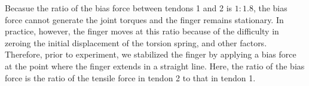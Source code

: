 \documentclass{llncs}
\begin{document}
Becasue the ratio of the bias force between tendons 1 and 2 is $1:1.8$, 
the bias force cannot generate the joint torques and 
the finger remains stationary.
In practice, however, the finger moves at this ratio
because of the difficulty in zeroing the initial displacement of the torsion spring, and other factors.
Therefore, prior to experiment,
we stabilized the finger by applying a bias force at the point where the finger extends in a straight line.
Here, the ratio of the bias force is the ratio of the tensile force in tendon 2 to that in tendon 1.
\end{document}
